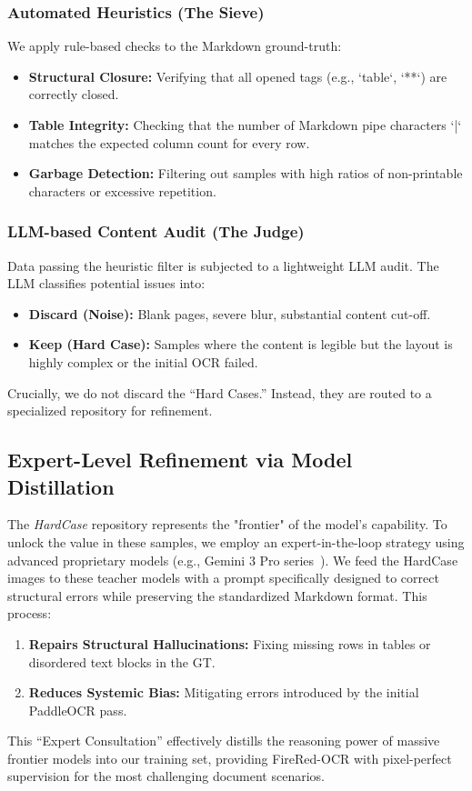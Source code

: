 \subsubsection{Automated Heuristics (The Sieve)}
We apply rule-based checks to the Markdown ground-truth:
\begin{itemize}
    \item \textbf{Structural Closure:} Verifying that all opened tags (e.g., `table`, `**`) are correctly closed.
    \item \textbf{Table Integrity:} Checking that the number of Markdown pipe characters `|` matches the expected column count for every row.
    \item \textbf{Garbage Detection:} Filtering out samples with high ratios of non-printable characters or excessive repetition.
\end{itemize}

\subsubsection{LLM-based Content Audit (The Judge)}
Data passing the heuristic filter is subjected to a lightweight LLM audit. The LLM classifies potential issues into:
\begin{itemize}
    \item \textbf{Discard (Noise):} Blank pages, severe blur, substantial content cut-off.
    \item \textbf{Keep (Hard Case):} Samples where the content is legible but the layout is highly complex or the initial OCR failed.
\end{itemize}
Crucially, we do not discard the ``Hard Cases.'' Instead, they are routed to a specialized repository for refinement.

\subsection{Expert-Level Refinement via Model Distillation}
The \textit{HardCase} repository represents the "frontier" of the model's capability. To unlock the value in these samples, we employ an expert-in-the-loop strategy using advanced proprietary models (e.g., Gemini 3 Pro series~\cite{google2025gemini3pro}).
We feed the HardCase images to these teacher models with a prompt specifically designed to correct structural errors while preserving the standardized Markdown format. This process:
\begin{enumerate}
    \item \textbf{Repairs Structural Hallucinations:} Fixing missing rows in tables or disordered text blocks in the GT.
    \item \textbf{Reduces Systemic Bias:} Mitigating errors introduced by the initial PaddleOCR pass.
\end{enumerate}
This ``Expert Consultation'' effectively distills the reasoning power of massive frontier models into our training set, providing FireRed-OCR with pixel-perfect supervision for the most challenging document scenarios.